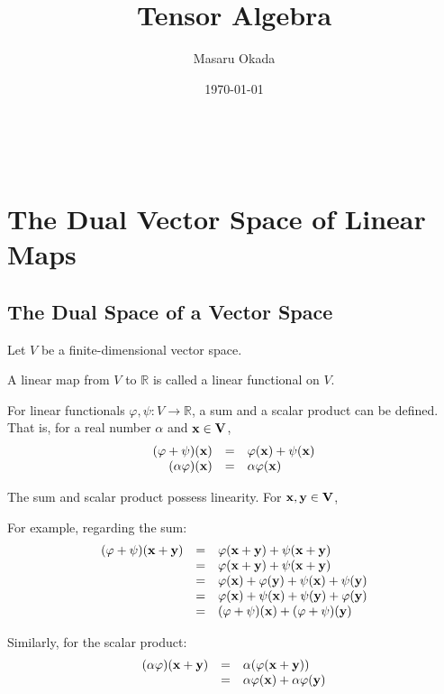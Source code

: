 \documentclass[uplatex,a4j,12pt,dvipdfmx]{jsarticle}
\title{
Tensor Algebra
}
\author{Masaru Okada}
\date{\today}
\begin{document}
\maketitle

\tableofcontents

\ \\

\section{The Dual Vector Space of Linear Maps}

\subsection{The Dual Space of a Vector Space}

Let $V$ be a finite-dimensional vector space.

A linear map from $V$ to $\mathbb{R}$ is called a linear functional on $V$.

For linear functionals $\varphi, \psi : V \to \mathbb{R}$,
a sum and a scalar product can be defined.
That is, for a real number $\alpha$ and
$\bf{x} \in V$,
\[
	\begin{array}{rcl}
		(\varphi + \psi) (\bf{x}) & = & \varphi (\bf{x}) + \psi (\bf{x})
		\\
		(\alpha \varphi) (\bf{x}) & = & \alpha \varphi (\bf{x})
	\end{array}
\]

The sum and scalar product possess linearity.
For $\bf{x}, \bf{y} \in V$,

For example, regarding the sum:
\[
	\begin{array}{rcl}
		(\varphi + \psi) (\bf{x} + \bf{y}) & = & \varphi (\bf{x} + \bf{y}) + \psi (\bf{x} + \bf{y})
		\\
		                                   & = &
		\varphi (\bf{x} + \bf{y}) + \psi (\bf{x} + \bf{y})
		\\
		                                   & = &
		\varphi (\bf{x}) + \varphi (\bf{y})
		+
		\psi (\bf{x}) + \psi (\bf{y})
		\\
		                                   & = &
		\varphi (\bf{x}) + \psi (\bf{x})
		+ \psi (\bf{y}) + \varphi (\bf{y})
		\\
		                                   & = &
		(\varphi + \psi) (\bf{x}) + (\varphi + \psi) (\bf{y})
	\end{array}
\]

Similarly, for the scalar product:
\[
	\begin{array}{rcl}
		(\alpha \varphi) (\bf{x} + \bf{y}) & = & \alpha ( \varphi (\bf{x} + \bf{y}) )
		\\
		                                   & = &
		\alpha \varphi (\bf{x}) + \alpha \varphi (\bf{y})
	\end{array}
\]
\end{document}
